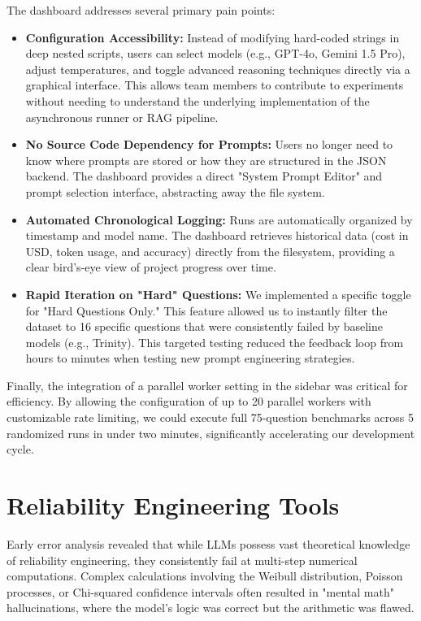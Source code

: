 The dashboard addresses several primary pain points:
\begin{itemize}
    \item \textbf{Configuration Accessibility:} Instead of modifying hard-coded strings in deep nested scripts, users can select models (e.g., GPT-4o, Gemini 1.5 Pro), adjust temperatures, and toggle advanced reasoning techniques directly via a graphical interface. This allows team members to contribute to experiments without needing to understand the underlying implementation of the asynchronous runner or RAG pipeline.
    \item \textbf{No Source Code Dependency for Prompts:} Users no longer need to know where prompts are stored or how they are structured in the JSON backend. The dashboard provides a direct "System Prompt Editor" and prompt selection interface, abstracting away the file system.
    \item \textbf{Automated Chronological Logging:} Runs are automatically organized by timestamp and model name. The dashboard retrieves historical data (cost in USD, token usage, and accuracy) directly from the filesystem, providing a clear bird's-eye view of project progress over time.
    \item \textbf{Rapid Iteration on "Hard" Questions:} We implemented a specific toggle for "Hard Questions Only." This feature allowed us to instantly filter the dataset to 16 specific questions that were consistently failed by baseline models (e.g., Trinity). This targeted testing reduced the feedback loop from hours to minutes when testing new prompt engineering strategies.
\end{itemize}

Finally, the integration of a parallel worker setting in the sidebar was critical for efficiency. By allowing the configuration of up to 20 parallel workers with customizable rate limiting, we could execute full 75-question benchmarks across 5 randomized runs in under two minutes, significantly accelerating our development cycle.

\section{Reliability Engineering Tools}
\label{sec:tools}

Early error analysis revealed that while LLMs possess vast theoretical knowledge of reliability engineering, they consistently fail at multi-step numerical computations. Complex calculations involving the Weibull distribution, Poisson processes, or Chi-squared confidence intervals often resulted in "mental math" hallucinations, where the model's logic was correct but the arithmetic was flawed.

